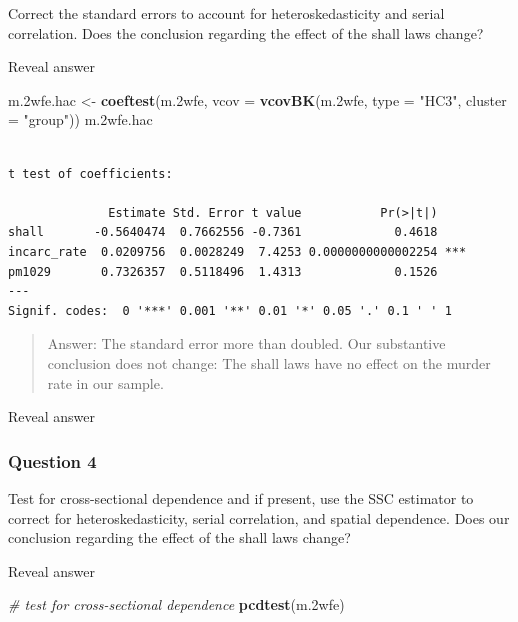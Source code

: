 \documentclass[]{article}
\newenvironment{Shaded}{\begin{snugshade}}{\end{snugshade}}
\newcommand{\KeywordTok}[1]{\textcolor[rgb]{0.13,0.29,0.53}{\textbf{#1}}}
\newcommand{\DataTypeTok}[1]{\textcolor[rgb]{0.13,0.29,0.53}{#1}}
\newcommand{\StringTok}[1]{\textcolor[rgb]{0.31,0.60,0.02}{#1}}
\newcommand{\CommentTok}[1]{\textcolor[rgb]{0.56,0.35,0.01}{\textit{#1}}}
\newcommand{\NormalTok}[1]{#1}
\theoremstyle{definition}
\theoremstyle{definition}
\theoremstyle{definition}
\theoremstyle{remark}
\begin{document}
Correct the standard errors to account for heteroskedasticity and serial
correlation. Does the conclusion regarding the effect of the shall laws
change?

 Reveal answer

\begin{Shaded}
\begin{Highlighting}[]
\NormalTok{m.2wfe.hac <-}\StringTok{ }\KeywordTok{coeftest}\NormalTok{(m.2wfe, }\DataTypeTok{vcov =} \KeywordTok{vcovBK}\NormalTok{(m.2wfe, }\DataTypeTok{type =} \StringTok{"HC3"}\NormalTok{, }\DataTypeTok{cluster =} \StringTok{"group"}\NormalTok{))}
\NormalTok{m.2wfe.hac}
\end{Highlighting}
\end{Shaded}

\begin{verbatim}

t test of coefficients:

              Estimate Std. Error t value           Pr(>|t|)    
shall       -0.5640474  0.7662556 -0.7361             0.4618    
incarc_rate  0.0209756  0.0028249  7.4253 0.0000000000002254 ***
pm1029       0.7326357  0.5118496  1.4313             0.1526    
---
Signif. codes:  0 '***' 0.001 '**' 0.01 '*' 0.05 '.' 0.1 ' ' 1
\end{verbatim}

\begin{quote}
Answer: The standard error more than doubled. Our substantive conclusion
does not change: The shall laws have no effect on the murder rate in our
sample.
\end{quote}

 Reveal answer

\subsubsection{Question 4}\label{question-4-1}

Test for cross-sectional dependence and if present, use the SSC
estimator to correct for heteroskedasticity, serial correlation, and
spatial dependence. Does our conclusion regarding the effect of the
shall laws change?

 Reveal answer

\begin{Shaded}
\begin{Highlighting}[]
\CommentTok{# test for cross-sectional dependence}
\KeywordTok{pcdtest}\NormalTok{(m.2wfe)}
\end{Highlighting}
\end{Shaded}
\end{document}
